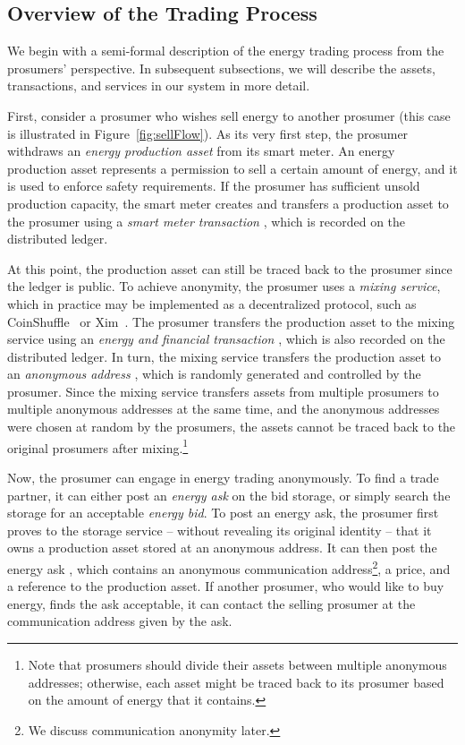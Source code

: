 \subsection{Overview of the Trading Process}
We begin with a semi-formal description of the energy trading process from the prosumers' perspective.
In subsequent subsections, we will describe the assets, transactions, and services in our system in more detail.

First, consider a prosumer who wishes sell energy to another prosumer (this case is illustrated in Figure~\ref{fig:sellFlow}).
As its very first step, the prosumer withdraws an \emph{energy production asset} from its smart meter.
An energy production asset represents a permission to sell a certain amount of energy, and it is used to enforce safety requirements.
If the prosumer has sufficient unsold production capacity, the smart meter creates and transfers a production asset to the prosumer using a \emph{smart meter transaction} , which is recorded on the distributed ledger.

At this point, the production asset can still be traced back to the prosumer since the ledger is public.
To achieve anonymity, the prosumer uses a \emph{mixing service}, which in practice may be implemented as a decentralized protocol, such as CoinShuffle~\cite{ruffing2014coinshuffle} or Xim~\cite{bissias2014sybil}.
The prosumer transfers the production asset to the mixing service using an \emph{energy and financial transaction} , which is also recorded on the distributed ledger.
In turn, the mixing service transfers the production asset to an \emph{anonymous address} , which is randomly generated and controlled by the prosumer.
Since the mixing service transfers assets from multiple prosumers to multiple anonymous addresses at the same time, and the anonymous addresses were chosen at random by the prosumers, the assets cannot be traced back to the original prosumers after mixing.\footnote{Note that prosumers should divide their assets between multiple anonymous addresses; otherwise, each asset might be traced back to its prosumer based on the amount of energy that it contains.}

Now, the prosumer can engage in energy trading anonymously.
To find a trade partner, it can either post an \emph{energy ask} on the bid storage, or simply search the storage for an acceptable \emph{energy bid}.
To post an energy ask, the prosumer first proves to the storage service -- without revealing its original identity -- that it owns a production asset stored at an anonymous address.
It can then post the energy ask , which contains an anonymous communication address\footnote{We discuss communication anonymity later.}, a price, and a reference to the production asset.
If another prosumer, who would like to buy energy, finds the ask acceptable, it can contact the selling prosumer at the communication address given by the ask.

